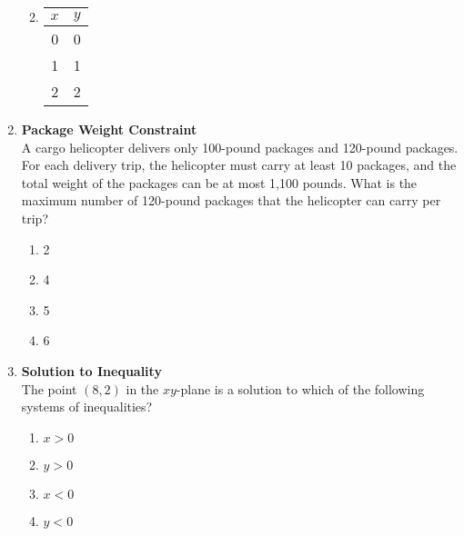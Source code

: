 \begin{enumerate}
\begin{enumerate}[label=(\Alph*)]
\begin{center}
  \end{center}
  \item
  \begin{center}
  \begin{tabular}{|c|c|}
  \hline
  $x$ & $y$ \\
  \hline
  0 & 0 \\
  \hline
  1 & 1 \\
  \hline
  2 & 2 \\
  \hline
  \end{tabular}
  \end{center}
\end{enumerate}
\begin{subanswer}
\end{subanswer}

\item \textbf{Package Weight Constraint}\\
A cargo helicopter delivers only 100-pound packages and 120-pound packages. For each delivery trip, the helicopter must carry at least 10 packages, and the total weight of the packages can be at most 1,100 pounds. What is the maximum number of 120-pound packages that the helicopter can carry per trip?
\begin{enumerate}[label=(\Alph*)]
  \item 2
  \item 4
  \item 5
  \item 6
\end{enumerate}
\begin{subanswer}
\end{subanswer}

\item \textbf{Solution to Inequality}\\
The point $(8,2)$ in the $xy$-plane is a solution to which of the following systems of inequalities?
\begin{enumerate}[label=(\Alph*)]
  \item $x > 0$
  \item $y > 0$
  \item $x < 0$
  \item $y < 0$
\end{enumerate}
\begin{subanswer}
\end{subanswer}


\end{enumerate}
